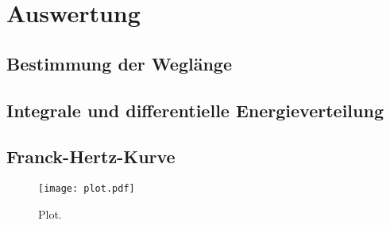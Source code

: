 \section{Auswertung}
\label{sec:Auswertung}

\subsection{Bestimmung der Weglänge}
\label{subsec:Weglänge}



\subsection{Integrale und differentielle Energieverteilung}
\label{subsec:Energieverteilung}




\subsection{Franck-Hertz-Kurve} %
\label{sub:Franck-Hertz-Kurve}




\begin{figure}
  \centering
  \texttt{[image: plot.pdf]}
  \caption{Plot.}
  \label{fig:plot}
\end{figure}



